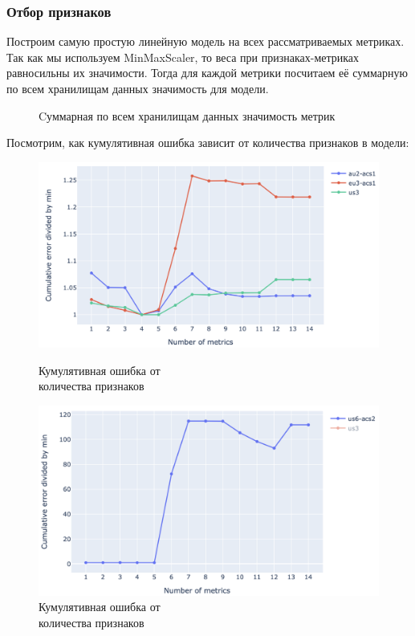 \documentclass[14pt, a4paper]{extarticle}
\begin{document}
\subsubsection{Отбор признаков}	
Построим самую простую линейную модель на всех рассматриваемых метриках. Так как мы используем MinMaxScaler, то веса при признаках-метриках равносильны их значимости. Тогда для каждой метрики посчитаем её суммарную по всем хранилищам данных значимость для модели.
\begin{figure}[H]
		\centerline{} 
		\caption{Cуммарная по всем хранилищам данных значимость метрик}
		\label{target_metric_fig1}
	\end{figure} 	
Посмотрим, как кумулятивная ошибка зависит от количества признаков в модели:
\begin{figure}[!htb]
		\includegraphics[width=\linewidth]{figures/mae_num_features_1.png}
		\caption{Кумулятивная ошибка  от \\количества признаков}
		\endminipage\hfill
		\includegraphics[width=\linewidth]{figures/mae_num_features_2.png}
		\caption{Кумулятивная ошибка  от \\количества признаков}
		\endminipage
	\end{figure}
	
\end{document}
